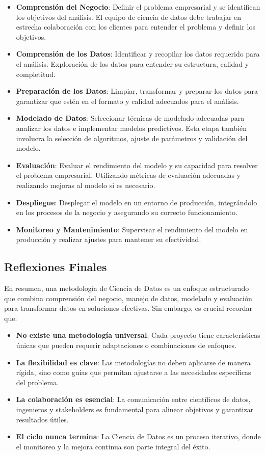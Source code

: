 \documentclass[12pt]{book}
\begin{document}
\begin{itemize}
    \item \textbf{Comprensión del Negocio}: Definir el problema empresarial y se identifican los objetivos del análisis. El equipo de ciencia de datos debe trabajar en estrecha colaboración con los clientes para entender el problema y definir los objetivos.
    \item \textbf{Comprensión de los Datos}: Identificar y recopilar los datos requerido para el análisis. Exploración de los datos para entender su estructura, calidad y completitud.
    \item \textbf{Preparación de los Datos}: Limpiar, transformar y preparar los datos para garantizar que estén en el formato y calidad adecuados para el análisis.
    \item \textbf{Modelado de Datos}: Seleccionar técnicas de modelado adecuadas para analizar los datos e implementar modelos predictivos. Esta etapa también involucra la selección de algoritmos, ajuste de parámetros y validación del modelo.
    \item \textbf{Evaluación}: Evaluar el rendimiento del modelo y su capacidad para resolver el problema empresarial. Utilizando métricas de evaluación adecuadas y realizando mejoras al modelo si es necesario.
    \item \textbf{Despliegue}: Desplegar el modelo en un entorno de producción, integrándolo en los procesos de la negocio y asegurando su correcto funcionamiento.
    \item \textbf{Monitoreo y Mantenimiento}: Supervisar el rendimiento del modelo en producción y realizar ajustes para mantener su efectividad.
\end{itemize}

\subsection{Reflexiones Finales}
En resumen, una metodología de Ciencia de Datos es un enfoque estructurado que combina comprensión del negocio, manejo de datos, modelado y evaluación para transformar datos en soluciones efectivas. Sin embargo, es crucial recordar que:

\begin{itemize}
    \item \textbf{No existe una metodología universal}: Cada proyecto tiene características únicas que pueden requerir adaptaciones o combinaciones de enfoques.
    \item \textbf{La flexibilidad es clave}: Las metodologías no deben aplicarse de manera rígida, sino como guías que permitan ajustarse a las necesidades específicas del problema.
    \item \textbf{La colaboración es esencial}: La comunicación entre científicos de datos, ingenieros y stakeholders es fundamental para alinear objetivos y garantizar resultados útiles.
    \item \textbf{El ciclo nunca termina}: La Ciencia de Datos es un proceso iterativo, donde el monitoreo y la mejora continua son parte integral del éxito.
\end{itemize}
\end{document}
